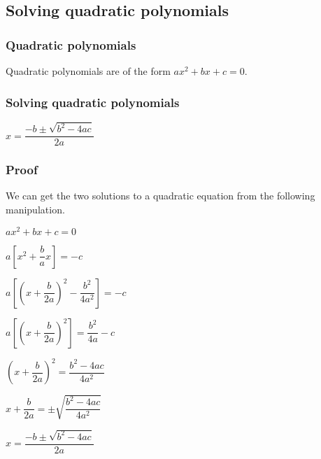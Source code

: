 
\subsection{Solving quadratic polynomials}

\subsubsection{Quadratic polynomials}

Quadratic polynomials are of the form \(ax^2+bx+c=0\).

\subsubsection{Solving quadratic polynomials}

\(x=\dfrac{-b\pm \sqrt {b^2-4ac}}{2a}\)

\subsubsection{Proof}

We can get the two solutions to a quadratic equation from the following manipulation.

\(ax^2+bx+c=0\)

\(a[x^2+\dfrac{b}{a}x]=-c\)

\(a[(x+\dfrac{b}{2a})^2-\dfrac{b^2}{4a^2}]=-c\)

\(a[(x+\dfrac{b}{2a})^2]=\dfrac{b^2}{4a}-c\)

\((x+\dfrac{b}{2a})^2=\dfrac{b^2-4ac}{4a^2}\)

\(x+\dfrac{b}{2a}=\pm \sqrt {\dfrac{b^2-4ac}{4a^2}}\)

\(x=\dfrac{-b\pm \sqrt {b^2-4ac}}{2a}\)


